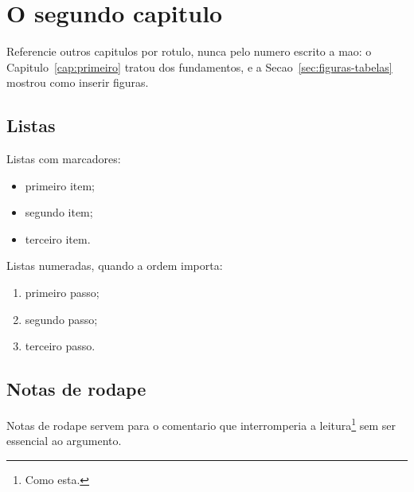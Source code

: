 \chapter{O segundo capitulo}
\label{cap:segundo}

Referencie outros capitulos por rotulo, nunca pelo numero escrito a mao: o
Capitulo~\ref{cap:primeiro} tratou dos fundamentos, e a
Secao~\ref{sec:figuras-tabelas} mostrou como inserir figuras.

\section{Listas}

Listas com marcadores:

\begin{itemize}
  \item primeiro item;
  \item segundo item;
  \item terceiro item.
\end{itemize}

Listas numeradas, quando a ordem importa:

\begin{enumerate}
  \item primeiro passo;
  \item segundo passo;
  \item terceiro passo.
\end{enumerate}

\section{Notas de rodape}

Notas de rodape servem para o comentario que interromperia a leitura\footnote{Como
esta.} sem ser essencial ao argumento.
